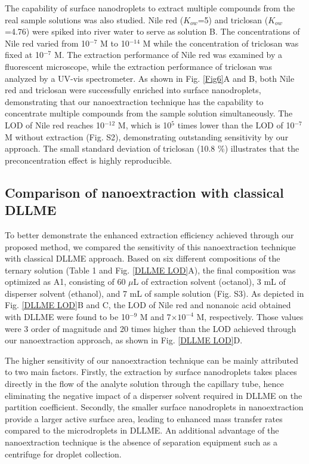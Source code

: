 \documentclass[a4paper,fleqn]{cas-dc}
\begin{document}
\begin{sloppypar}
The capability of surface nanodroplets to extract multiple compounds from the real sample solutions was also studied. Nile red ($K_{ow}$=5) and triclosan ($K_{ow}$=4.76) were spiked into river water to serve as solution B.\cite{bach1993biotechnology,kaur2019biomimetic} The concentrations of Nile red varied from 10$^{-7}$ M to 10$^{-14}$ M while the concentration of triclosan was fixed at 10$^{-7}$ M. 
The extraction performance of Nile red was examined by a fluorescent microscope, while the extraction performance of triclosan was analyzed by a UV-vis spectrometer. As shown in Fig. \ref{Fig6}A and B, both Nile red and triclosan were successfully enriched into surface nanodroplets, demonstrating that our nanoextraction technique has the capability to concentrate multiple compounds from the sample solution simultaneously. The LOD of Nile red reaches 10$^{-12}$ M, which is 10$^{5}$ times lower than the LOD of 10$^{-7}$ M without extraction (Fig. S2), demonstrating outstanding sensitivity by our approach. The small standard deviation of triclosan (10.8 \%) illustrates that the preconcentration effect is highly reproducible.



\subsection{Comparison of nanoextraction with classical DLLME}

To better demonstrate the enhanced extraction efficiency achieved through our proposed method, we compared the sensitivity of this nanoextraction technique with classical DLLME approach. Based on six different compositions of the ternary solution (Table 1 and Fig. \ref{DLLME LOD}A), the final composition was optimized as A1, consisting of 60 $\mu$L of extraction solvent (octanol), 3 mL of disperser solvent (ethanol), and 7 mL of sample solution (Fig. S3). As depicted in Fig. \ref{DLLME LOD}B and C, the LOD of Nile red and nonanoic acid obtained with DLLME were found to be 10$^{-9}$ M and 7$\times10^{-4}$ M, respectively. Those values were 3 order of magnitude and 20 times higher than the LOD achieved through our nanoextraction approach, as shown in Fig. \ref{DLLME LOD}D.

The higher sensitivity of our nanoextraction technique can be mainly attributed to two main factors. Firstly, the extraction by surface nanodroplets takes places directly in the flow of the analyte solution through the capillary tube, hence eliminating the negative impact of a disperser solvent required in DLLME on the partition coefficient. Secondly, the smaller surface nanodroplets in nanoextraction provide a larger active surface area, leading to enhanced mass transfer rates compared to the microdroplets in DLLME. An additional advantage of the nanoextraction technique is the absence of separation equipment such as a centrifuge for droplet collection.    


\end{sloppypar}
\end{document}
